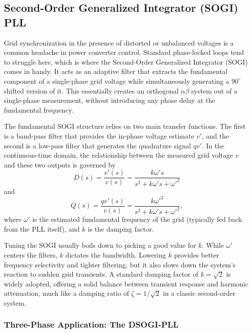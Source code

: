 \subsection{Second-Order Generalized Integrator (SOGI) PLL}
\label{subsec:sogi-pll}

Grid synchronization in the presence of distorted or unbalanced voltages is a common headache in power converter control. Standard phase-locked loops tend to struggle here, which is where the Second-Order Generalized Integrator (SOGI) comes in handy. It acts as an adaptive filter that extracts the fundamental component of a single-phase grid voltage while simultaneously generating a \(90^{\circ}\) shifted version of it. This essentially creates an orthogonal \(\alpha\beta\) system out of a single-phase measurement, without introducing any phase delay at the fundamental frequency.

The fundamental SOGI structure relies on two main transfer functions. The first is a band-pass filter that provides the in-phase voltage estimate \(v'\), and the second is a low-pass filter that generates the quadrature signal \(qv'\). In the continuous-time domain, the relationship between the measured grid voltage \(v\) and these two outputs is governed by
\begin{equation}
	\label{eq:sogi-d-s}
	D(s) = \frac{v'(s)}{v(s)} = \frac{k\omega' s}{s^2 + k\omega' s + \omega'^2}
\end{equation}
and
\begin{equation}
	\label{eq:sogi-q-s}
	Q(s) = \frac{qv'(s)}{v(s)} = \frac{k\omega'^2}{s^2 + k\omega' s + \omega'^2},
\end{equation}
where \(\omega'\) is the estimated fundamental frequency of the grid (typically fed back from the PLL itself), and \(k\) is the damping factor. 

Tuning the SOGI usually boils down to picking a good value for \(k\). While \(\omega'\) centers the filters, \(k\) dictates the bandwidth. Lowering \(k\) provides better frequency selectivity and tighter filtering, but it also slows down the system's reaction to sudden grid transients. A standard damping factor of \(k = \sqrt{2}\) is widely adopted, offering a solid balance between transient response and harmonic attenuation, much like a damping ratio of \(\zeta = 1/\sqrt{2}\) in a classic second-order system.

\subsubsection{Three-Phase Application: The DSOGI-PLL}
\label{subsubsec:dsogi-pll}


